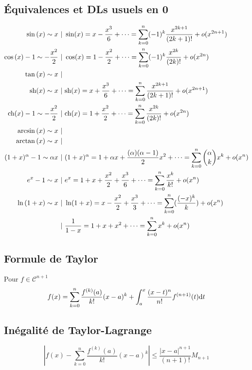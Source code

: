 \documentclass[]{article}
\begin{document}
\subsection*{Équivalences et DLs usuels en 0}
\begin{align*}
    \sin{(x)} \sim x &\text{ } | \text{ } \sin (x) = x - \frac{x^3}{6} + \dots = \sum_{k=0}^{n} (-1)^k \frac{x^{2k+1}}{(2k+1)!} + o(x^{2n+1}) \\
    \cos{(x)}-1 \sim -\frac{x^2}{2} &\text{ } | \text{ } \cos (x) = 1 - \frac{x^2}{2} + \dots = \sum_{k=0}^{n} (-1)^k \frac{x^{2k}}{(2k)!} + o(x^{2n})\\
    \tan{(x)} \sim x &\text{ } | \text{ }\\
    \text{sh}{(x)} \sim x &\text{ } | \text{ } \text{sh} (x) = x + \frac{x^3}{6} + \dots = \sum_{k=0}^{n}\frac{x^{2k+1}}{(2k+1)!} + o(x^{2n+1})\\
    \text{ch}{(x)}-1 \sim -\frac{x^2}{2} &\text{ } | \text{ } \text{ch} (x) = 1 + \frac{x^2}{2} + \dots = \sum_{k=0}^{n}\frac{x^{2k}}{(2k)!} + o(x^{2n})\\
    \arcsin{(x)} \sim x &\text{ } | \text{ }\\
    \arctan{(x)} \sim x &\text{ } | \text{ }\\
    (1+x)^\alpha - 1 \sim \alpha x &\text{ } | \text{ } (1+x)^\alpha = 1 + \alpha x + \frac{(\alpha)(\alpha - 1)}{2}x^2 + \dots = \sum_{k=0}^{n}\binom{\alpha}{k} x^k + o(x^n)\\
    e^{x} - 1 \sim x &\text{ } | \text{ } e^x = 1 + x + \frac{x^2}{2} + \frac{x^3}{6} + \dots = \sum_{k=0}^{n}\frac{x^k}{k!} + o(x^n)\\
    \ln{(1+x)} \sim x &\text{ } | \text{ } \ln(1+x) = x - \frac{x^2}{2} + \frac{x^3}{3} + \dots = \sum_{k=0}^{n} (\frac{(-x)^k}{k}) + o(x^n)\\
    &\text{ } | \text{ } \frac{1}{1-x} = 1 + x + x^2 + \dots = \sum_{k=0}^{n} x^k + o(x^n)
\end{align*}

\subsection*{Formule de Taylor}
Pour $f \in \mathcal{C}^{n+1}$
\[ f(x) = \sum_{k=0}^{n} \frac{f^{(k)}(a)}{k!}(x-a)^k + \int_{a}^{x} \frac{(x-t)^n}{n!}f^{(n+1)} (t) \text{d}t \]

\subsection*{Inégalité de Taylor-Lagrange}
\[ \left |f(x) - \sum_{k=0}^{n} \frac{f^{(k)}(a)}{k!}(x-a)^k \right | \leq \frac{|x-a|^{n+1}}{(n+1)!} M_{n+1} \]
\end{document}
